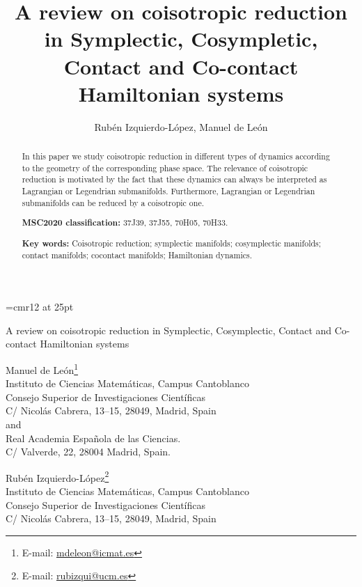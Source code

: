 \documentclass[12pt]{article}
\title{\myfont A review on coisotropic reduction in Symplectic, Cosympletic, Contact and Co-contact Hamiltonian systems}
\author{Rubén Izquierdo-López, Manuel de León}
\date{}
\begin{document}
 
\font \myfont=cmr12 at 25pt


\thispagestyle{toc}
\begin{center}
{\myfont A review on coisotropic reduction in Symplectic, Cosymplectic, Contact and Co-contact Hamiltonian systems}
\end{center}
\hfill

\begin{center}

Manuel de Le\'on\footnote{E-mail: \href{mailto:mdeleon@icmat.es}{mdeleon@icmat.es}}
\\ Instituto de Ciencias Matem\'aticas, Campus Cantoblanco \\
 Consejo Superior de Investigaciones Cient\'ificas
 \\
C/ Nicol\'as Cabrera, 13--15, 28049, Madrid, Spain
\\
and
\\
Real Academia Espa{\~n}ola de las Ciencias.
\\
C/ Valverde, 22, 28004 Madrid, Spain.

\bigskip

Rubén Izquierdo-López\footnote{E-mail: \href{mailto:rubizqui@ucm.es}{rubizqui@ucm.es}}
\\ Instituto de Ciencias Matem\'aticas, Campus Cantoblanco \\
 Consejo Superior de Investigaciones Cient\'ificas
 \\
C/ Nicol\'as Cabrera, 13--15, 28049, Madrid, Spain
\end{center}
\hfill




\begin{abstract} 
In this paper we study coisotropic reduction in different types of dynamics according to the geometry of the corresponding phase space. The relevance of coisotropic reduction is motivated by the fact that these dynamics can always be interpreted as Lagrangian or Legendrian submanifolds. Furthermore, Lagrangian or Legendrian submanifolds can be reduced by a coisotropic one.


\smallskip

\noindent \textbf{MSC2020 classification:} 37J39, 37J55, 70H05, 70H33.
\smallskip

\noindent  \textbf{Key words:} Coisotropic reduction; symplectic manifolds; cosymplectic manifolds; contact manifolds; cocontact manifolds; Hamiltonian dynamics.

 \end{abstract}
\end{document}
